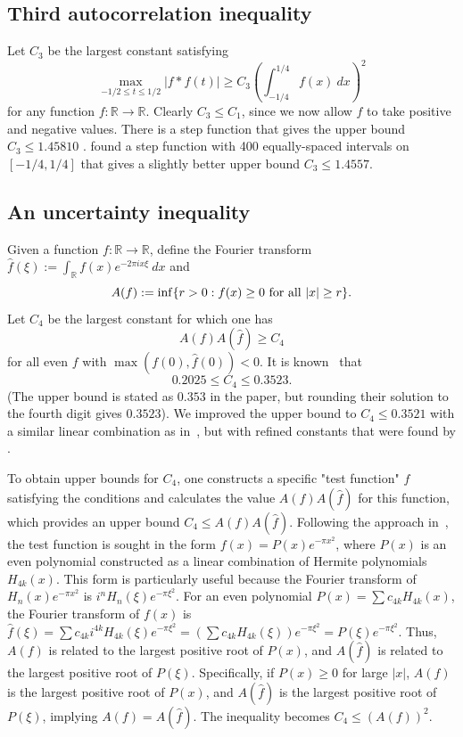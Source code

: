 \subsection{Third autocorrelation inequality}
Let $C_3$ be the largest constant satisfying
$$ \max_{-1/2 \leq t \leq 1/2} \left|f*f(t)\right| \geq C_3 \left(\int_{-1/4}^{1/4} f(x)\ dx\right)^2$$
for any function $f: \mathbb{R}  \rightarrow \mathbb{R}$. Clearly $C_3 \leq C_1$, since we now allow $f$ to take positive and negative values.  
There is a step function that gives the upper bound $C_3 \leq 1.45810$ \cite[page 75]{vinuesa2010generalized}.
\method found a step function with 400 equally-spaced intervals on $[-1/4,1/4]$ that gives a slightly better upper bound $C_3 \leq 1.4557$.


\subsection{An uncertainty inequality}

Given a function $f: \mathbb{R} \to \mathbb{R}$, define the Fourier transform $\hat f(\xi) := \int_\mathbb{R} f(x) e^{-2\pi i x\xi}\ dx$ and
$$ A(f) := \inf \{r > 0: f(x) \geq 0 \hbox{ for all } |x| \geq r \}.$$
Let $C_4$ be the largest constant for which one has
$$ A(f) A(\hat f) \geq C_4$$
for all even $f$ with $\max(f(0), \hat f(0)) < 0$.  It is known~\cite{gonccalves2017hermite} that
$$ 0.2025 \leq C_4 \leq 0.3523.$$
(The upper bound is stated as $0.353$ in the paper, but rounding their solution to the fourth digit gives $0.3523$).
We improved the upper bound to $C_4 \leq 0.3521$ with a similar linear combination as in~\cite{gonccalves2017hermite}, but with refined constants that were found by \method.

To obtain upper bounds for $C_4$, one constructs a specific "test function" $f$ satisfying the conditions and calculates the value $A(f)A(\hat f)$ for this function, which provides an upper bound $C_4 \le A(f)A(\hat f)$. Following the approach in~\cite{gonccalves2017hermite}, the test function is sought in the form $f(x) = P(x)e^{-\pi x^2}$, where $P(x)$ is an even polynomial constructed as a linear combination of Hermite polynomials $H_{4k}(x)$. This form is particularly useful because the Fourier transform of $H_n(x)e^{-\pi x^2}$ is $i^n H_n(\xi)e^{-\pi \xi^2}$. For an even polynomial $P(x) = \sum c_{4k} H_{4k}(x)$, the Fourier transform of $f(x)$ is $\hat f(\xi) = \sum c_{4k} i^{4k} H_{4k}(\xi)e^{-\pi \xi^2} = (\sum c_{4k} H_{4k}(\xi))e^{-\pi \xi^2} = P(\xi)e^{-\pi \xi^2}$. Thus, $A(f)$ is related to the largest positive root of $P(x)$, and $A(\hat f)$ is related to the largest positive root of $P(\xi)$. Specifically, if $P(x) \ge 0$ for large $|x|$, $A(f)$ is the largest positive root of $P(x)$, and $A(\hat f)$ is the largest positive root of $P(\xi)$, implying $A(f) = A(\hat f)$. The inequality becomes $C_4 \le (A(f))^2$.

